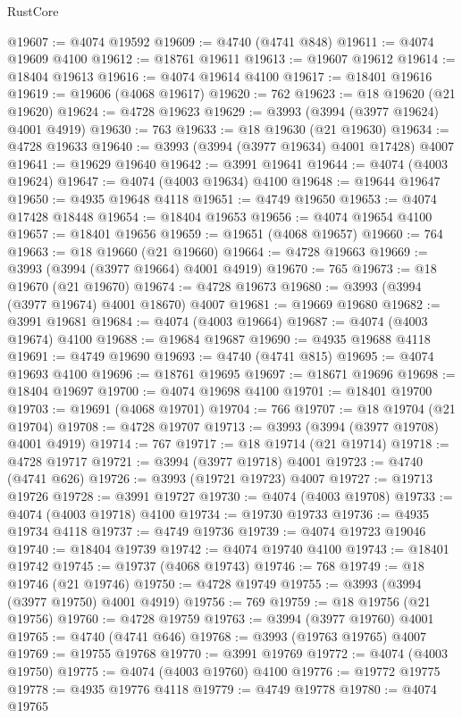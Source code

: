 \begin{lexlean}{RustCore}
\begin{coremodule}
@19607 := @4074 @19592
@19609 := @4740 (@4741 @848)
@19611 := @4074 @19609 @4100
@19612 := @18761 @19611
@19613 := @19607 @19612
@19614 := @18404 @19613
@19616 := @4074 @19614 @4100
@19617 := @18401 @19616
@19619 := @19606 (@4068 @19617)
@19620 := 762
@19623 := @18 @19620 (@21 @19620)
@19624 := @4728 @19623
@19629 := @3993 (@3994 (@3977 @19624) @4001 @4919)
@19630 := 763
@19633 := @18 @19630 (@21 @19630)
@19634 := @4728 @19633
@19640 := @3993 (@3994 (@3977 @19634) @4001 @17428) @4007
@19641 := @19629 @19640
@19642 := @3991 @19641
@19644 := @4074 (@4003 @19624)
@19647 := @4074 (@4003 @19634) @4100
@19648 := @19644 @19647
@19650 := @4935 @19648 @4118
@19651 := @4749 @19650
@19653 := @4074 @17428 @18448
@19654 := @18404 @19653
@19656 := @4074 @19654 @4100
@19657 := @18401 @19656
@19659 := @19651 (@4068 @19657)
@19660 := 764
@19663 := @18 @19660 (@21 @19660)
@19664 := @4728 @19663
@19669 := @3993 (@3994 (@3977 @19664) @4001 @4919)
@19670 := 765
@19673 := @18 @19670 (@21 @19670)
@19674 := @4728 @19673
@19680 := @3993 (@3994 (@3977 @19674) @4001 @18670) @4007
@19681 := @19669 @19680
@19682 := @3991 @19681
@19684 := @4074 (@4003 @19664)
@19687 := @4074 (@4003 @19674) @4100
@19688 := @19684 @19687
@19690 := @4935 @19688 @4118
@19691 := @4749 @19690
@19693 := @4740 (@4741 @815)
@19695 := @4074 @19693 @4100
@19696 := @18761 @19695
@19697 := @18671 @19696
@19698 := @18404 @19697
@19700 := @4074 @19698 @4100
@19701 := @18401 @19700
@19703 := @19691 (@4068 @19701)
@19704 := 766
@19707 := @18 @19704 (@21 @19704)
@19708 := @4728 @19707
@19713 := @3993 (@3994 (@3977 @19708) @4001 @4919)
@19714 := 767
@19717 := @18 @19714 (@21 @19714)
@19718 := @4728 @19717
@19721 := @3994 (@3977 @19718) @4001
@19723 := @4740 (@4741 @626)
@19726 := @3993 (@19721 @19723) @4007
@19727 := @19713 @19726
@19728 := @3991 @19727
@19730 := @4074 (@4003 @19708)
@19733 := @4074 (@4003 @19718) @4100
@19734 := @19730 @19733
@19736 := @4935 @19734 @4118
@19737 := @4749 @19736
@19739 := @4074 @19723 @19046
@19740 := @18404 @19739
@19742 := @4074 @19740 @4100
@19743 := @18401 @19742
@19745 := @19737 (@4068 @19743)
@19746 := 768
@19749 := @18 @19746 (@21 @19746)
@19750 := @4728 @19749
@19755 := @3993 (@3994 (@3977 @19750) @4001 @4919)
@19756 := 769
@19759 := @18 @19756 (@21 @19756)
@19760 := @4728 @19759
@19763 := @3994 (@3977 @19760) @4001
@19765 := @4740 (@4741 @646)
@19768 := @3993 (@19763 @19765) @4007
@19769 := @19755 @19768
@19770 := @3991 @19769
@19772 := @4074 (@4003 @19750)
@19775 := @4074 (@4003 @19760) @4100
@19776 := @19772 @19775
@19778 := @4935 @19776 @4118
@19779 := @4749 @19778
@19780 := @4074 @19765

\end{coremodule}
\end{lexlean}
